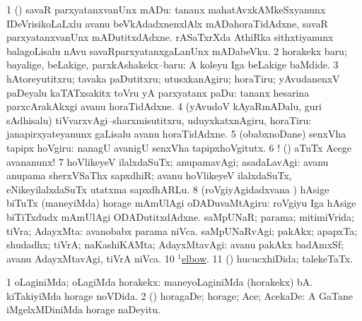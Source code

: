 \noindent
\gl{\pagu}
\bmng
\bnum
\num{1}  (\ashi) savaR parxyatanxvanUnx mADu:  tananx mahatAvxkAMkeSxyanunx IDeVrisikoLaLxlu avanu beVkAdadxnenxlAlx mADahoraTidAdxne, savaR parxyatanxvanUnx mADutitxdAdxne.  rASaTxrXda AthiRka sithxtiyanunx balagoLisalu nAvu savaRparxyatanxgaLanUnx mADabeVku. 
\num{2}  horakekx baru; bayalige, beLakige, parxkAshakekx--baru:  A koleyu Iga beLakige baMdide. 
\num{3}  hAtoreyutitxru; tavaka paDutitxru; utusxkanAgiru; horaTiru; yAvudanenxV paDeyalu kaTATxsakitx toVru yA parxyatanx paDu:  tananx hesarina parxcArakAkxgi avanu horaTidAdxne. 
\num{4}  (yAvudoV kAyaRmADalu, guri sAdhisalu) tiVvarxvAgi--sharxmisutitxru, uduyxkatxnAgiru, horaTiru:  janapirxyateyanunx gaLisalu avanu horaTidAdxne. 
\num{5}  (obabxnoDane) senxVha tapipx hoVgiru:  nanagU avanigU senxVha tapipxhoVgitutx. 
\num{6} ! (\BAavayx) aTuTx Acege avananunx! 
\num{7}  hoVlikeyeV ilalxdaSuTx; anupamavAgi; asadaLavAgi:  avanu anupama sherxVSaThx sapxdhiR; avanu hoVlikeyeV ilalxdaSuTx, eNikeyilalxdaSuTx utatxma sapxdhARLu. 
\num{8}  (roVgiyAgidadxvana \vi) hAsige biTuTx (maneyiMda) horage mAmUlAgi oDADuvaMtAgiru:  roVgiyu Iga hAsige biTiTxdudx mAmUlAgi ODADutitxdAdxne. 
  
\banum
{} saMpUNaR; parama; mitimiVrida; tiVra; AdayxMta:  avanobabx parama niVca. 
 saMpUNaRvAgi; pakAkx; apapxTa; shudadhx; tiVrA; naKashiKAMta; AdayxMtavAgi:  avanu pakAkx badAmxSf; avanu AdayxMtavAgi, tiVrA niVca. 
\eanum
\numie
\num{10}  \hyperref{kandict_e.pdf}{E}{elbow(1) nuga(4)}{$^1$elbow}. 
\num{11}  (\AmA) hucucxhiDida; talekeTaTx. 
\enum
\emng
\eentry

\bentry
{}
\gl{\upa}
\bmng
\bnum
\num{1} oLaginiMda; oLagiMda horakekx:  maneyoLaginiMda (horakekx) bA.  kiTakiyiMda horage noVDida. 
\num{2} (\pArxparx) horagaDe; horage; Ace; AcekaDe:  A GaTane iMgelxMDiniMda horage naDeyitu. 
\enum
\emng

